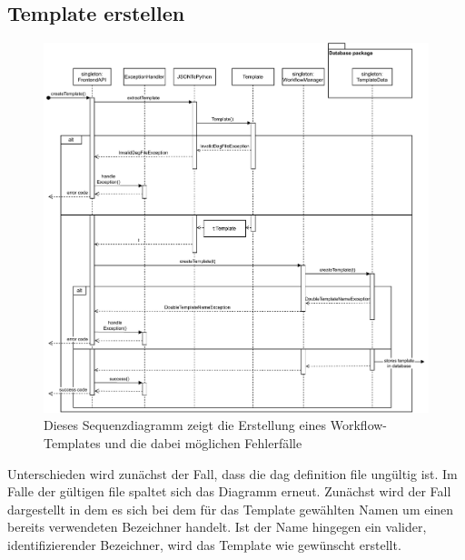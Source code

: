 \subsection{Template erstellen}
\begin{figure}[H]
	\centering
	\includegraphics[width=\textwidth]{res/createTemplate.pdf} 
	\caption{Dieses Sequenzdiagramm zeigt die Erstellung eines Workflow-Templates und die dabei möglichen Fehlerfälle}
\end{figure}
Unterschieden wird zunächst der Fall, dass die dag definition file ungültig ist. Im Falle der gültigen file spaltet sich das Diagramm erneut. Zunächst wird der Fall dargestellt in dem es sich bei dem für das Template gewählten Namen um einen bereits verwendeten Bezeichner handelt. Ist der Name hingegen ein valider, identifizierender Bezeichner, wird das Template wie gewünscht erstellt.

